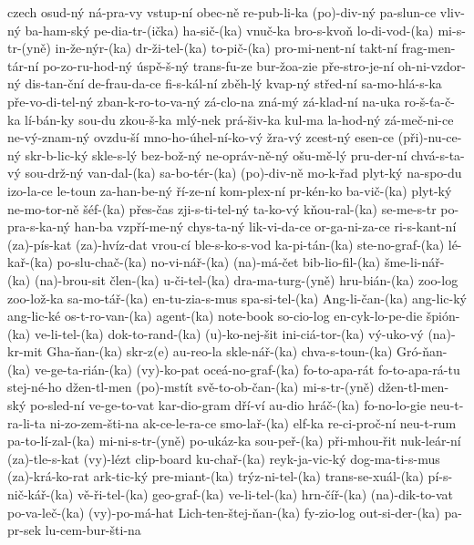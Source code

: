 \begin{hyphenrules}{czech}
{ osud-ný
 ná-pra-vy
 vstup-ní
 obec-ně
 re-pub-li-ka
 (po)-div-ný
 pa-slun-ce
 vliv-ný
 ba-ham-ský
 pe-dia-tr-(ička)
 ha-sič-(ka)
 vnuč-ka
 bro-s-kvoň
 lo-di-vod-(ka)
 mi-s-tr-(yně)
 in-že-nýr-(ka)
 dr-ži-tel-(ka)
 to-pič-(ka)
 pro-mi-nent-ní
 takt-ní
 frag-men-tár-ní
 po-zo-ru-hod-ný
 úspě-š-ný
 trans-fu-ze
 bur-žoa-zie
 pře-stro-je-ní
 oh-ni-vzdor-ný
 dis-tan-ční
 de-frau-da-ce
 fi-s-kál-ní
 zběh-lý
 kvap-ný
 střed-ní
 sa-mo-hlá-s-ka
 pře-vo-di-tel-ný
 zban-k-ro-to-va-ný
 zá-clo-na
 zná-mý
 zá-klad-ní
 na-uka
 ro-š-ťa-č-ka
 lí-bán-ky
 sou-du
 zkou-š-ka
 mlý-nek
 prá-šiv-ka
 kul-ma
 la-hod-ný
 zá-meč-ni-ce
 ne-vý-znam-ný
 ovzdu-ší
 mno-ho-úhel-ní-ko-vý
 žra-vý
 zcest-ný
 esen-ce
 (při)-nu-ce-ný
 skr-b-lic-ký
 skle-s-lý
 bez-bož-ný
 ne-opráv-ně-ný
 ošu-mě-lý
 pru-der-ní
 chvá-s-ta-vý
 sou-drž-ný
 van-dal-(ka)
 sa-bo-tér-(ka)
 (po)-div-ně
 mo-k-řad
 plyt-ký
 na-spo-du
 izo-la-ce
 le-toun
 za-han-be-ný
 ří-ze-ní
 kom-plex-ní
 pr-kén-ko
 ba-vič-(ka)
 plyt-ký
 ne-mo-tor-ně
 šéf-(ka)
 přes-čas
 zji-s-ti-tel-ný
 ta-ko-vý
 kňou-ral-(ka)
 se-me-s-tr
 po-pra-s-ka-ný
 han-ba
 vzpří-me-ný
 chys-ta-ný
 lik-vi-da-ce
 or-ga-ni-za-ce
 ri-s-kant-ní
 (za)-pís-kat
 (za)-hvíz-dat
 vrou-cí
 ble-s-ko-s-vod
 ka-pi-tán-(ka)
 ste-no-graf-(ka)
 lé-kař-(ka)
 po-slu-chač-(ka)
 no-vi-nář-(ka)
 (na)-má-čet
 bib-lio-fil-(ka)
 šme-li-nář-(ka)
 (na)-brou-sit
 člen-(ka)
 u-či-tel-(ka)
 dra-ma-turg-(yně)
 hru-bián-(ka)
 zoo-log
 zoo-lož-ka
 sa-mo-tář-(ka)
 en-tu-zia-s-mus
 spa-si-tel-(ka)
 Ang-li-čan-(ka)
 ang-lic-ký
 ang-lic-ké
 os-t-ro-van-(ka)
 agent-(ka)
 note-book
 so-cio-log
 en-cyk-lo-pe-die
 špión-(ka)
 ve-li-tel-(ka)
 dok-to-rand-(ka)
 (u)-ko-nej-šit
 ini-ciá-tor-(ka)
 vý-uko-vý
 (na)-kr-mit
 Gha-ňan-(ka)
 skr-z(e)
 au-reo-la
 skle-nář-(ka)
 chva-s-toun-(ka)
 Gró-ňan-(ka)
 ve-ge-ta-rián-(ka)
 (vy)-ko-pat
 oceá-no-graf-(ka)
 fo-to-apa-rát
 fo-to-apa-rá-tu
 stej-né-ho
 džen-tl-men
 (po)-mstít
 svě-to-ob-čan-(ka)
 mi-s-tr-(yně)
 džen-tl-men-ský
 po-sled-ní
 ve-ge-to-vat
 kar-dio-gram
 dří-ví
 au-dio
 hráč-(ka)
 fo-no-lo-gie
 neu-t-ra-li-ta
 ni-zo-zem-šti-na
 ak-ce-le-ra-ce
 smo-lař-(ka)
 elf-ka
 re-ci-proč-ní
 neu-t-rum
 pa-to-lí-zal-(ka)
 mi-ni-s-tr-(yně)
 po-ukáz-ka
 sou-peř-(ka)
 při-mhou-řit
 nuk-leár-ní
 (za)-tle-s-kat
 (vy)-lézt
 clip-board
 ku-chař-(ka)
 reyk-ja-vic-ký
 dog-ma-ti-s-mus
 (za)-krá-ko-rat
 ark-tic-ký
 pre-miant-(ka)
 trýz-ni-tel-(ka)
 trans-se-xuál-(ka)
 pí-s-nič-kář-(ka)
 vě-ři-tel-(ka)
 geo-graf-(ka)
 ve-li-tel-(ka)
 hrn-číř-(ka)
 (na)-dik-to-vat
 po-va-leč-(ka)
 (vy)-po-má-hat
 Lich-ten-štej-ňan-(ka)
 fy-zio-log
 out-si-der-(ka)
 pa-pr-sek
 lu-cem-bur-šti-na
}
\end{hyphenrules}
